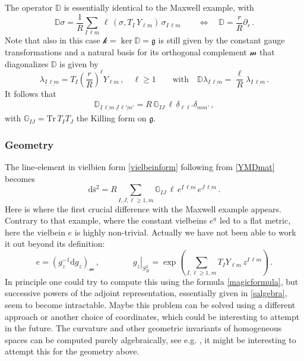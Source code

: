 \documentclass[11pt,a4paper]{article}
\def\calsk{\boldsymbol{\mathscr k}}
\def\calsm{{\boldsymbol{\mathscr m}}}
\def\ua{{\underline{a}}}
\def\ulm{{\underline{\ell m}}}
\def\ulmp{{\underline{\ell'm'}}}
\def\uI{{\underline{I}}}
\def\uJ{{\underline{J}}}
\def\rd{{\mathrm{d}}}
\def\Tr{\mathrm{Tr}}
\def\Dperp{{\mathbb{D}}}
\begin{document}
    The operator $\Dperp$ is essentially identical to the Maxwell example, with
    	\begin{equation}
    	\Dperp\sigma=\frac{1}{R}\sum_{I\,\ell m}\,\ell\,(\sigma,T_I\,Y_{\ell m})\,\sigma_{I\, \ell m}\qquad\Leftrightarrow\quad \Dperp=\frac{r}{R}\partial_r\label{DperpYM}\,.
    	\end{equation}
    Note that also in this case $\calsk=\ker\Dperp=\mathfrak{g}$ is still given by the constant gauge transformations and a natural basis for its orthogonal complement $\calsm$ that diagonalizes $\Dperp$ is given by
    \begin{equation}
    \lambda_{\uI\,\ulm}=T_I \left(\frac{r}{R}\right)^{\ell} Y_{\ell m}\,,\quad\ell\geq 1\qquad\mbox{with}\quad \Dperp \lambda_{\uI\,\ulm}=\frac{\ell}{R} \lambda_{\uI\,\ulm}\,.\label{eigeq}
    \end{equation}
    It follows that 
    \begin{eqnarray}
    \Dperp_{\uI\,\ulm\ \uJ\,\ulmp}=R\,\mathbb{G}_{IJ}\,\ell\,\delta_{\ell\ell'}\delta_{mm'}\label{YMDmat}  \,,
    \end{eqnarray}
    with $\mathbb{G}_{IJ}=\Tr\,T_IT_J$ the Killing form on $\mathfrak{g}$.
    
    \subsubsection{Geometry}
    The line-element in vielbien form \eqref{vielbeinform} following from \eqref{YMDmat} becomes
    \begin{equation}
    \rd\bar{\mathrm{s}}^2=R\!\!\sum_{I,J,\ell\geq 1, m}\mathbb{G}_{IJ}\,\ell\,e^{\uI\,\ulm}\,e^{\uJ\,\ulm}  \,.
    \end{equation}
    Here is where the first crucial difference with the Maxwell example appears. Contrary to that example, where the constant vielbeins $e^\ua$ led to a flat metric, here the vielbein $e$ is highly non-trivial. Actually we have not been able to work it out beyond its definition:
    \begin{equation}
    e=\left(g_z^{-1}\rd g_z\right)_\calsm\,,\qquad\qquad \left.g_z\right|_{S_R^2}=\exp\left(\sum_{I,\ell\geq1,m}T_{I}Y_{\ell m}\,z^{I\,\ell m}\right)  \,.
    \end{equation}
    In principle one could try to compute this using the formula \eqref{magicformula}, but successive powers of the adjoint representation, essentially given in \eqref{salgebra}, seem to become intractable. Maybe this problem can be solved using a different approach or another choice of coordinates, which could be interesting to attempt in the future. The curvature and other geometric invariants of homogeneous spaces can be computed purely algebraically, see e.g. \cite{arvanitogeorgos2003introduction}, it might be interesting to attempt this for the geometry above.
    
\end{document}
